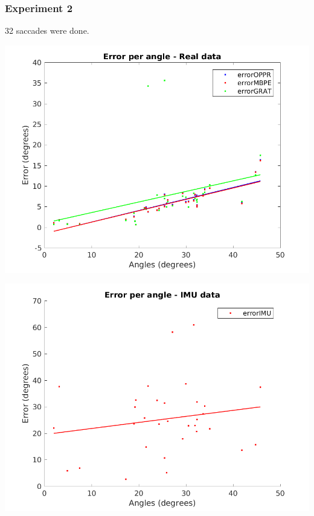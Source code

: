\subsubsection{Experiment 2}
32 saccades were done.\\
\begin{minipage}{0.5\textwidth}
	\centering
	\includegraphics[width=\textwidth]{images/sim/r2angle.png}
	\label{cha5:sec1:r2angle}
\end{minipage}
\begin{minipage}{0.5\textwidth}
	\centering
	\includegraphics[width=\textwidth]{images/sim/r2angleimu.png}
	\label{cha5:sec1:r2angleimu}
\end{minipage}\\


